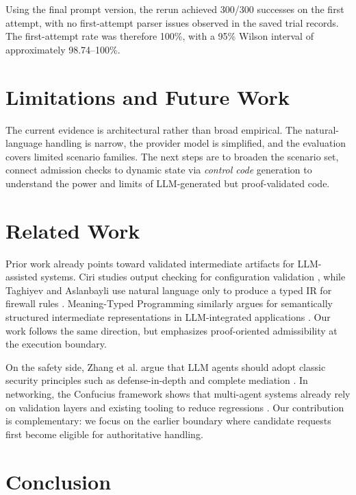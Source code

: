 \documentclass[conference]{IEEEtran}
\begin{document}
Using the final prompt version, the rerun achieved 300/300 successes on the first attempt, with no first-attempt parser issues observed in the saved trial records. The first-attempt rate was therefore 100\%, with a 95\% Wilson interval of approximately 98.74--100\%.

\section{Limitations and Future Work}

The current evidence is architectural rather than broad empirical. The natural-language handling is narrow, the provider model is simplified, and the evaluation covers limited scenario families. The next steps are to broaden the scenario set, connect admission checks to dynamic state via \textit{control code} generation to understand the power and limits of LLM-generated but proof-validated code.

\section{Related Work}

Prior work already points toward validated intermediate artifacts for LLM-assisted systems. Ciri studies output checking for configuration validation \cite{ciri}, while Taghiyev and Aslanbayli use natural language only to produce a typed IR for firewall rules \cite{firewall_nl}. Meaning-Typed Programming similarly argues for semantically structured intermediate representations in LLM-integrated applications \cite{mtp}. Our work follows the same direction, but emphasizes proof-oriented admissibility at the execution boundary.

On the safety side, Zhang et al. argue that LLM agents should adopt classic security principles such as defense-in-depth and complete mediation \cite{security_principles}. In networking, the Confucius framework shows that multi-agent systems already rely on validation layers and existing tooling to reduce regressions \cite{confucius}. Our contribution is complementary: we focus on the earlier boundary where candidate requests first become eligible for authoritative handling.

\section{Conclusion}
\end{document}

